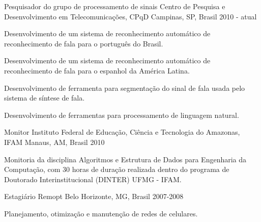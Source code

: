 

\begin{cventries}

  \cventry
    {Pesquisador do grupo de processamento de sinais} %
    {Centro de Pesquisa e Desenvolvimento em Telecomunicações, CPqD} %
    {Campinas, SP, Brasil} %
    {2010 - atual} %
    {
      \begin{cvitems} %
        \item {Desenvolvimento de um sistema de reconhecimento automático de reconhecimento de fala para o português do Brasil.}
        \item {Desenvolvimento de um sistema de reconhecimento automático de reconhecimento de fala para o espanhol da América Latina.}
        \item {Desenvolvimento de ferramenta para segmentação do sinal de fala usada pelo sistema de síntese de fala.}
        \item {Desenvolvimento de ferramentas para processamento de linguagem natural.}
      \end{cvitems}
    }

  \cventry
    {Monitor} %
    {Instituto Federal de Educação, Ciência e Tecnologia do Amazonas, IFAM} %
    {Manaus, AM, Brasil} %
    {2010} %
    {
      \begin{cvitems} %
        \item {Monitoria da disciplina Algoritmos e Estrutura de Dados para Engenharia da Computação, com 30 horas de duração realizada dentro do programa de Doutorado Interinstitucional (DINTER) UFMG - IFAM.}
      \end{cvitems}
    }

  \cventry
    {Estagiário} %
    {Remopt} %
    {Belo Horizonte, MG, Brasil} %
    {2007-2008} %
    {
      \begin{cvitems} %
        \item {Planejamento, otimização e manutenção de redes de celulares.}
      \end{cvitems} 
    }


\end{cventries}
